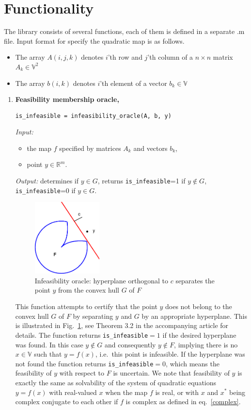 \documentclass[a4paper]{article}
\theoremstyle{definition}
\begin{document}
\newpage

\section*{Functionality}
The library consists of several functions, each of them is defined in a separate .m file.
Input format for specify the quadratic map is as follows.

\begin{itemize}
\item The array $A(i, j, k)$ denotes $i$'th row and $j$'th column of a $n\times n$ matrix $A_k\in\mathbb{V}^2$
\item The array $b(i, k)$ denotes $i$'th element of a vector $b_k\in\mathbb{V}$
\end{itemize}

\begin{enumerate}
\item {\bf Feasibility membership oracle,\hskip 6pt}
\begin{verbatim}
is_infeasible = infeasibility_oracle(A, b, y)
\end{verbatim}
{\it Input:}
\begin{itemize}
\item the map $f$ specified by matrices $A_k$ and vectors $b_k$,
\item point $y\in\mathbb{R}^m$.
\end{itemize}
{\it Output:} determines if $y\in G$, returns {\tt is\_infeasible}=1 if $y\notin G$, {\tt is\_infeasible}=0 if $y\in G$.

\begin{figure}[H]
	\centering\includegraphics[width=100pt]{fig/infeasibility_oracle}
	\caption{Infeasibility oracle: hyperplane orthogonal to $c$ separates the point $y$ from the convex hull $G$ of $F$}
\label{fig:one}
\end{figure}

This function attempts to certify that the point $y$ does not belong to the convex hull $G$ of $F$ by separating $y$ and $G$ by an appropriate hyperplane. This is illustrated in Fig.~\ref{fig:one}, see Theorem 3.2 in the accompanying article for details.
The function returns {\tt is\_infeasible}$=1$ if the desired hyperplane was found. In this case $y\notin G$ and consequently $y\notin F$, implying there is no $x\in \mathbb{V}$ such that $y=f(x)$, i.e.~this point is infeasible. If the hyperplane was not found the function returns {\tt is\_infeasible}$=0$, which means the feasibility  of $y$ with respect to $F$ is uncertain. We note that feasibility of $y$  is exactly the same as solvability of the system of quadratic equations $y=f(x)$ with real-valued $x$ when the map $f$ is real, or with $x$ and $x^*$ being complex conjugate to each other if $f$ is complex as defined in eq.~\eqref{complex}.


\end{enumerate}
\end{document}
